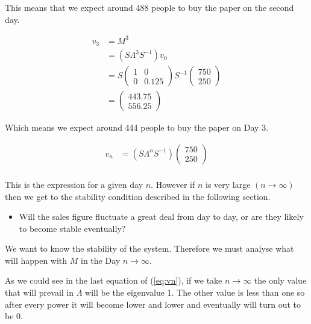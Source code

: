 \documentclass{article}
\begin{document}
This means that we expect around 488 people to buy the paper on the second day.

\begin{equation}
\begin{aligned}
v_3 &= M^3 \\
	&=(S\Lambda^3 S^{-1}) v_0\\
	     &=  
	S
	\begin{pmatrix}
	1 & 0 \\ 
	0 & 0.125
	\end{pmatrix}
	S^{-1} 
	\left(
	\begin{array}{c}
	750  \\
	250 
	 \end{array}
	 \right) \\
	  &=
	  \left(
	  \begin{array}{c}
	  443.75\\ 
	  556.25
	   \end{array}
	   \right) 
\end{aligned}
\end{equation}

Which means we expect around 444 people to buy the paper on Day 3.

\begin{equation}
\begin{aligned}
v_n &= (S\Lambda^n S^{-1}) 
	\left(
	\begin{array}{c}
	750  \\
	250 
	 \end{array}
	 \right) \\
\end{aligned}
\end{equation}

This is the expression for a given day $n$. However if $n$ is very large $(n\to\infty)$
then we get to the stability condition described in the following section.

\begin{itemize}
\item Will the sales figure fluctuate a great deal from day to day, or are they likely to
become stable eventually?
\end{itemize} 

We want to know the stability of the system. Therefore we must analyse what will
happen with $M$ in the Day $n\to\infty$.

As we could see in the last equation of (\ref{eq:vn}), if we take $n\to\infty$
the only value that will prevail in $\Lambda$ will be the eigenvalue 1.
The other value is less than one so after every power it will become lower and lower
and eventually will turn out to be 0.
\end{document}
